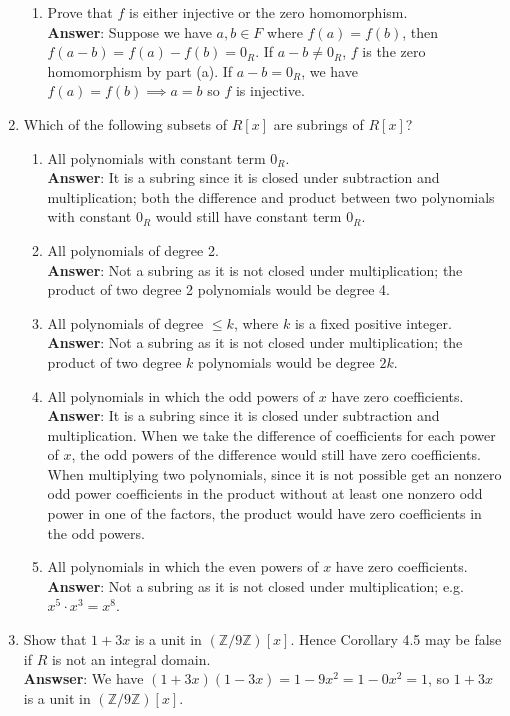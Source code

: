 \documentclass{article}
\begin{document}
\begin{enumerate}
\begin{enumerate}
                  \item Prove that $f$ is either injective or the zero homomorphism.\\
                        \textbf{Answer}: Suppose we have $a,b\in F$ where $f(a)=f(b)$, then $f(a-b)=f(a)-f(b)=0_R$. If $a-b\neq 0_R$, $f$ is the zero homomorphism by part (a). If $a-b=0_R$, we have $f(a)=f(b)\implies a=b$ so $f$ is injective.
            \end{enumerate}
      \item Which of the following subsets of $R[x]$ are subrings of $R[x]$?
            \begin{enumerate}
                  \item All polynomials with constant term $0_R$.\\
                        \textbf{Answer}: It is a subring since it is closed under subtraction and multiplication; both the difference and product between two polynomials with constant $0_R$ would still have constant term $0_R$.
                  \item All polynomials of degree 2.\\
                        \textbf{Answer}: Not a subring as it is not closed under multiplication; the product of two degree 2 polynomials would be degree 4.
                  \item All polynomials of degree $\leq k$, where $k$ is a fixed positive integer.\\
                        \textbf{Answer}: Not a subring as it is not closed under multiplication; the product of two degree $k$ polynomials would be degree $2k$.
                  \item All polynomials in which the odd powers of $x$ have zero coefficients.\\
                        \textbf{Answer}: It is a subring since it is closed under subtraction and multiplication. When we take the difference of coefficients for each power of $x$, the odd powers of the difference would still have zero coefficients. When multiplying two polynomials, since it is not possible get an nonzero odd power coefficients in the product without at least one nonzero odd power in one of the factors, the product would have zero coefficients in the odd powers.
                  \item All polynomials in which the even powers of $x$ have zero coefficients.\\
                        \textbf{Answer}: Not a subring as it is not closed under multiplication; e.g. $x^5\cdot x^3=x^8$.
            \end{enumerate}
      \item Show that $1+3x$ is a unit in $(\mathbb{Z}/9\mathbb{Z})[x]$. Hence Corollary 4.5 may be false if $R$ is not an integral domain.\\
            \textbf{Answser}: We have $(1+3x)(1-3x)=1-9x^2=1-0x^2=1$, so $1+3x$ is a unit in $(\mathbb{Z}/9\mathbb{Z})[x]$.
\end{enumerate}
\end{document}
